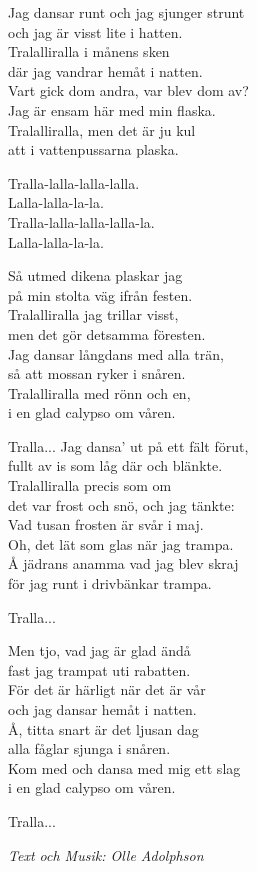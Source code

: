 \vspace{10pt}
Jag dansar runt och jag sjunger strunt\\
och jag är visst lite i hatten.\\
Tralalliralla i månens sken\\
där jag vandrar hemåt i natten.\\
Vart gick dom andra, var blev dom av?\\
Jag är ensam här med min flaska.\\
Tralalliralla, men det är ju kul\\
att i vattenpussarna plaska.\par
\vspace{10pt}
Tralla-lalla-lalla-lalla.\\
Lalla-lalla-la-la.\\
Tralla-lalla-lalla-lalla-la.\\
Lalla-lalla-la-la.\par
\vspace{10pt}
Så utmed dikena plaskar jag\\
på min stolta väg ifrån festen.\\
Tralalliralla jag trillar visst,\\
men det gör detsamma föresten.\\
Jag dansar långdans med alla trän,\\
så att mossan ryker i snåren.\\
Tralalliralla med rönn och en,\\
i en glad calypso om våren.\par
\vspace{10pt}
Tralla...
\newpage
Jag dansa' ut på ett fält förut,\\
fullt av is som låg där och blänkte.\\
Tralalliralla precis som om\\
det var frost och snö, och jag tänkte:\\
Vad tusan frosten är svår i maj.\\
Oh, det lät som glas när jag trampa.\\
Å jädrans anamma vad jag blev skraj\\
för jag runt i drivbänkar trampa.\par
\vspace{10pt}
Tralla...\par
\vspace{10pt}
Men tjo, vad jag är glad ändå\\
fast jag trampat uti rabatten.\\
För det är härligt när det är vår\\
och jag dansar hemåt i natten.\\
Å, titta snart är det ljusan dag\\
alla fåglar sjunga i snåren.\\
Kom med och dansa med mig ett slag\\
i en glad calypso om våren.\par
\vspace{10pt}
Tralla...\par
\vspace{10pt}
{\footnotesize\textit{Text och Musik: Olle Adolphson}}
